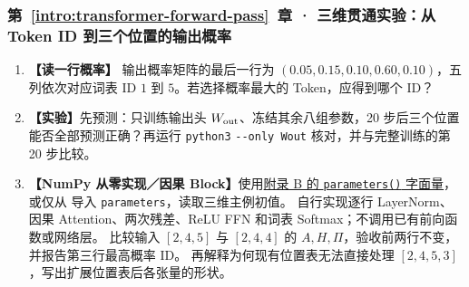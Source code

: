 \subsubsection*{第~\ref*{intro:transformer-forward-pass}~章 · 三维贯通实验：从 Token ID 到三个位置的输出概率}
\begin{enumerate}[label={},leftmargin=4.8em,itemsep=4pt]
\item[\textbf{C-074.}] \leavevmode{}\label{exercise:C-074}\label{exercise:probability-row-greedy}\textbf{【读一行概率】} 输出概率矩阵的最后一行为 $(0.05,0.15,0.10,0.60,0.10)$，五列依次对应词表 ID $1$ 到 $5$。若选择概率最大的 Token，应得到哪个 ID？
\item[\textbf{C-075.}] \leavevmode{}\label{exercise:C-075}\label{exercise:output-head-only-training}\textbf{【实验】}先预测：只训练输出头 $W_{\rm out}$、冻结其余八组参数，20 步后三个位置能否全部预测正确？再运行 \texttt{python3}  \texttt{-{}-only Wout} 核对，并与完整训练的第 20 步比较。
\item[\textbf{C-076.}] \leavevmode{}\label{exercise:C-076}\label{exercise:causal-input-change}\textbf{【NumPy 从零实现／因果 Block】}使用\hyperref[app:parameter-literal]{附录 B 的 \texttt{parameters()} 字面量}，或仅从  导入 \texttt{parameters}，读取三维主例初值。
自行实现逐行 LayerNorm、因果 Attention、两次残差、ReLU FFN 和词表 Softmax；不调用已有前向函数或网络层。
比较输入 $[2,4,5]$ 与 $[2,4,4]$ 的 $A,H,\Pi$，验收前两行不变，并报告第三行最高概率 ID。
再解释为何现有位置表无法直接处理 $[2,4,5,3]$，写出扩展位置表后各张量的形状。
\end{enumerate}
